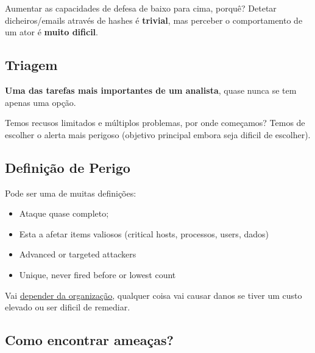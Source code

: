 \documentclass{article}
\begin{document}
\begin{flushleft}
  Aumentar as capacidades de defesa de baixo para cima, porquê? Detetar dicheiros/emails
  através de hashes é \textbf{trivial}, mas perceber o comportamento de um ator é \textbf{muito dificil}.
\end{flushleft}

\subsection{Triagem}

\begin{flushleft}
  \textbf{Uma das tarefas mais importantes de um analista}, quase nunca se tem apenas uma opção.

  \vspace{2mm}

  Temos recusos limitados e múltiplos problemas, por onde começamos? Temos de escolher
  o alerta mais perigoso (objetivo principal embora seja dificil de escolher).
\end{flushleft}

\pagebreak

\subsection{Definição de Perigo}

\begin{flushleft}
  Pode ser uma de muitas definições:
  \begin{itemize}
    \item Ataque quase completo;
    \item Esta a afetar items valiosos (critical hosts, processos, users, dados)
    \item Advanced or targeted attackers
    \item Unique, never fired before or lowest count
  \end{itemize}

  \vspace{2mm}

  Vai \uline{depender da organização}, qualquer coisa vai causar danos se tiver um custo elevado ou
  ser dificil de remediar.
\end{flushleft}

\subsection{Como encontrar ameaças?}
\end{document}
